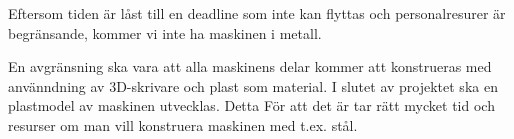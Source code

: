 Eftersom tiden är låst till en deadline som inte kan flyttas och personalresurer är begränsande,
kommer vi inte ha maskinen i metall.

En avgränsning ska vara att alla maskinens delar kommer att konstrueras med använndning av 3D-skrivare och plast som material. I slutet av projektet ska en plastmodel av maskinen utvecklas. Detta För att det är tar rätt mycket tid och resurser om man vill konstruera maskinen med t.ex. stål.
